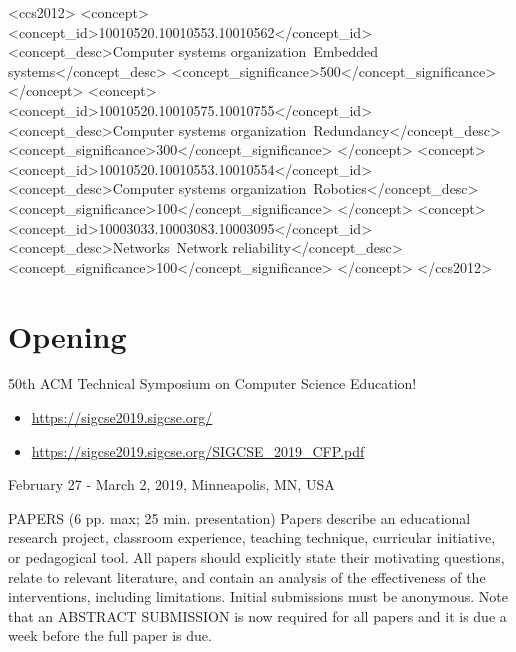\documentclass[sigconf]{acmart}
\begin{document}
%
%
\begin{CCSXML}
<ccs2012>
 <concept>
  <concept_id>10010520.10010553.10010562</concept_id>
  <concept_desc>Computer systems organization~Embedded systems</concept_desc>
  <concept_significance>500</concept_significance>
 </concept>
 <concept>
  <concept_id>10010520.10010575.10010755</concept_id>
  <concept_desc>Computer systems organization~Redundancy</concept_desc>
  <concept_significance>300</concept_significance>
 </concept>
 <concept>
  <concept_id>10010520.10010553.10010554</concept_id>
  <concept_desc>Computer systems organization~Robotics</concept_desc>
  <concept_significance>100</concept_significance>
 </concept>
 <concept>
  <concept_id>10003033.10003083.10003095</concept_id>
  <concept_desc>Networks~Network reliability</concept_desc>
  <concept_significance>100</concept_significance>
 </concept>
</ccs2012>
\end{CCSXML}





\maketitle

\section{Opening}

50th ACM Technical Symposium on Computer Science Education! 

\begin{itemize}
	\item \url{https://sigcse2019.sigcse.org/}
  \item \url{https://sigcse2019.sigcse.org/SIGCSE_2019_CFP.pdf}
\end{itemize}



February 27 - March 2, 2019, Minneapolis, MN, USA

PAPERS (6 pp. max; 25 min. presentation) Papers describe an educational research project, classroom experience, teaching
technique, curricular initiative, or pedagogical tool. All papers should explicitly state their motivating questions, relate to relevant
literature, and contain an analysis of the effectiveness of the interventions, including limitations. Initial submissions must be anonymous.
Note that an ABSTRACT SUBMISSION is now required for all papers and it is due a week before the full paper is due. 
\end{document}
